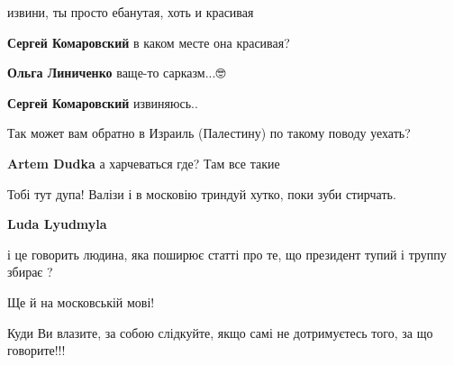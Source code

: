 \begin{itemize}
извини, ты просто ебанутая, хоть и красивая

\begin{itemize}

\textbf{Сергей Комаровский} в каком месте она красивая?


\textbf{Ольга Линиченко} ваще-то сарказм...🤓


\textbf{Сергей Комаровский} извиняюсь..
\end{itemize}


Так может вам обратно в Израиль (Палестину) по такому поводу уехать?

\begin{itemize}

\textbf{Artem Dudka} а харчеваться где? Там все такие
\end{itemize}


Тобі тут дупа! Валізи і в московію триндуй хутко, поки зуби стирчать.

\begin{itemize}

\textbf{Luda Lyudmyla} 

і це говорить людина, яка поширює статті про те, що президент тупий і труппу
збирає ?

Ще й на московській мові!

Куди Ви влазите, за собою слідкуйте, якщо самі не дотримуєтесь того, за що
говорите!!!

\end{itemize}



\end{itemize}
